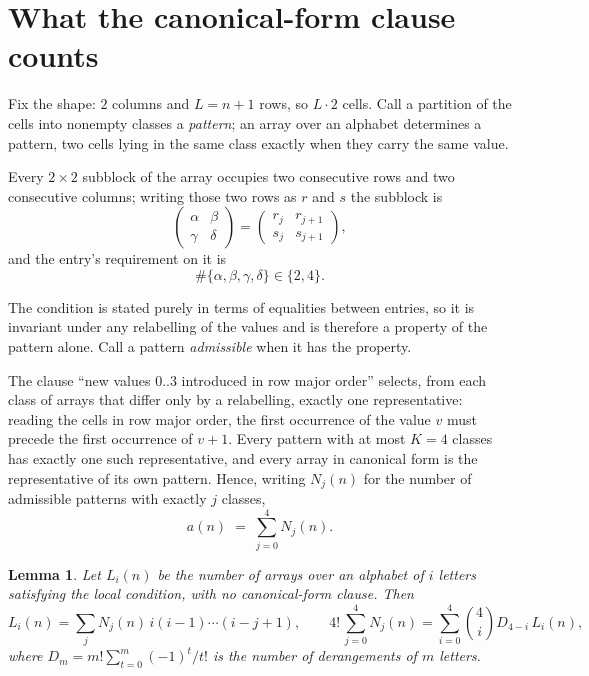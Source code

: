 \documentclass[11pt,a4paper]{article}
\theoremstyle{plain}
\newtheorem{lemma}[theorem]{Lemma}
\theoremstyle{definition}
\begin{document}
\section{What the canonical-form clause counts}

Fix the shape: $2$ columns and $L=n+1$ rows, so $L\cdot2$ cells. Call a
partition of the cells into nonempty classes a \emph{pattern}; an array over an alphabet
determines a pattern, two cells lying in the same class exactly when they carry the same
value.

Every $2\times2$ subblock of the array occupies two consecutive
rows and two consecutive columns; writing those two rows as $r$ and $s$ the
subblock is
\[
\begin{pmatrix}\alpha&\beta\\\gamma&\delta\end{pmatrix}=\begin{pmatrix}r_j&r_{j+1}\\s_j&s_{j+1}\end{pmatrix},
\]
and the entry's requirement on it is
\begin{equation}\label{eq:loc}
\#\{\alpha,\beta,\gamma,\delta\}\in\{2,4\}.
\end{equation}

The condition is stated purely in terms of equalities between entries, so it is invariant
under any relabelling of the values and is therefore a property of the pattern alone. Call a
pattern \emph{admissible} when it has the property.

The clause ``new values $0..3$ introduced in row major order'' selects, from each class
of arrays that differ only by a relabelling, exactly one representative: reading the cells in
row major order, the first occurrence of the value $v$ must precede the first occurrence of
$v+1$. Every pattern with at most $K=4$ classes has exactly one such representative, and
every array in canonical form is the representative of its own pattern. Hence, writing
$N_j(n)$ for the number of admissible patterns with exactly $j$ classes,
\begin{equation}\label{eq:apat}
a(n)\;=\;\sum_{j=0}^{4}N_j(n).
\end{equation}

\begin{lemma}\label{lem:inv}
Let $L_i(n)$ be the number of arrays over an alphabet of $i$ letters satisfying the local
condition, with no canonical-form clause. Then
\[
L_i(n)=\sum_j N_j(n)\,i(i-1)\cdots(i-j+1),
\qquad
4!\,\sum_{j=0}^{4}N_j(n)=\sum_{i=0}^{4}\binom{4}{i}D_{4-i}\,L_i(n),
\]
where $D_m=m!\sum_{t=0}^{m}(-1)^t/t!$ is the number of derangements of $m$ letters.
\end{lemma}
\end{document}
